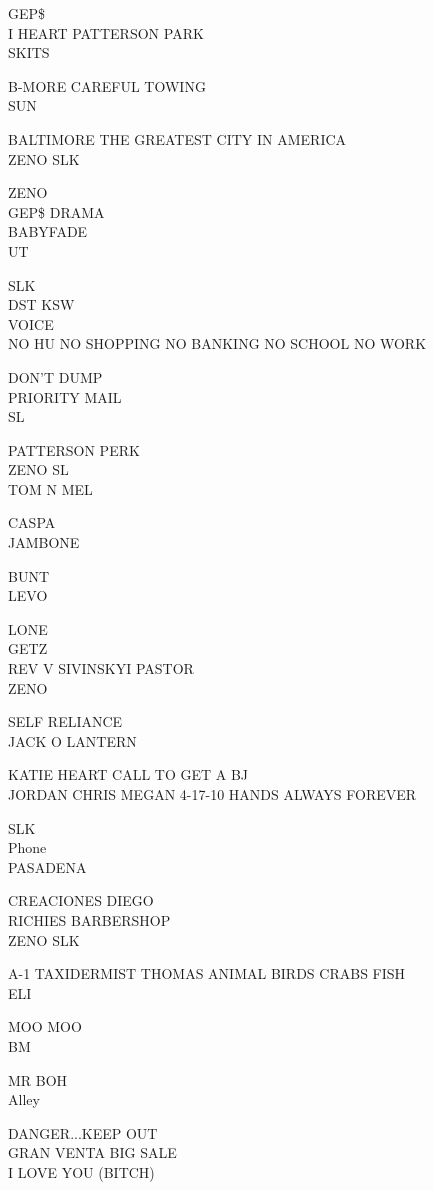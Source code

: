 \documentclass[10pt,letterpaper]{article}
\begin{document}
GEP\$\\
I HEART PATTERSON PARK\\
SKITS

B{-}MORE CAREFUL TOWING\\
SUN

BALTIMORE THE GREATEST CITY IN AMERICA\\
ZENO SLK

ZENO\\
GEP\$ DRAMA\\
BABYFADE\\
UT

SLK\\
DST KSW\\
VOICE\\
NO HU NO SHOPPING NO BANKING NO SCHOOL NO WORK

DON'T DUMP\\
PRIORITY MAIL\\
SL

PATTERSON PERK\\
ZENO SL\\
TOM N MEL

CASPA\\
JAMBONE

BUNT\\
LEVO

LONE\\
GETZ\\
REV V SIVINSKYI PASTOR\\
ZENO

SELF RELIANCE\\
JACK O LANTERN

KATIE HEART CALL TO GET A BJ\\
JORDAN CHRIS MEGAN 4{-}17{-}10 HANDS ALWAYS FOREVER

SLK\\
Phone\\
PASADENA

CREACIONES DIEGO\\
RICHIES BARBERSHOP\\
ZENO SLK

A{-}1 TAXIDERMIST THOMAS ANIMAL BIRDS CRABS FISH\\
ELI

MOO MOO\\
BM

MR BOH\\
Alley

DANGER...KEEP OUT\\
GRAN VENTA BIG SALE\\
I LOVE YOU (BITCH)
\end{document}

